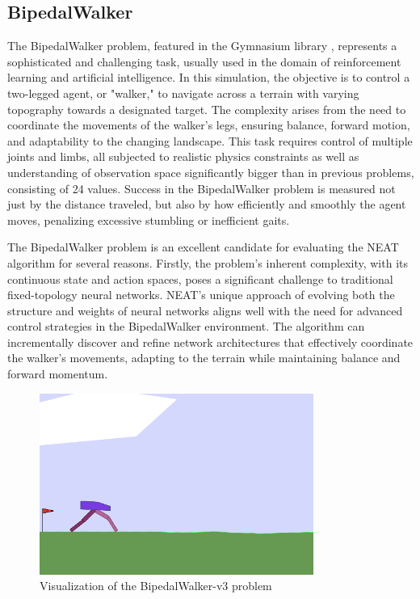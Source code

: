 \documentclass{article}
\begin{document}
        \subsection{BipedalWalker}
        The BipedalWalker problem, featured in the Gymnasium library \cite{gymnasium},
        represents a sophisticated and challenging task, usually used in the domain of reinforcement learning and artificial intelligence.
        In this simulation, the objective is to control a two-legged agent, or "walker," to navigate
        across a terrain with varying topography towards a designated target. The complexity arises from the
        need to coordinate the movements of the walker's legs, ensuring balance, forward motion, and adaptability to the changing landscape.
        This task requires control of multiple joints and limbs, all subjected to realistic physics constraints as well as understanding
        of observation space significantly bigger than in previous problems, consisting of 24 values.
        Success in the BipedalWalker problem is measured not just by the distance traveled,
        but also by how efficiently and smoothly the agent moves, penalizing excessive stumbling or inefficient gaits.

        \par The BipedalWalker problem is an excellent candidate for evaluating the NEAT
        algorithm for several reasons. Firstly, the problem's inherent complexity, with its continuous state and action spaces,
        poses a significant challenge to traditional fixed-topology neural networks.
        NEAT's unique approach of evolving both the structure and weights of neural networks aligns well with the need 
        for advanced control strategies in the BipedalWalker environment. The algorithm can 
        incrementally discover and refine network architectures that effectively coordinate the walker's
        movements, adapting to the terrain while maintaining balance and forward momentum.

    \begin{figure}[h]
        \centering
        \includegraphics[width=0.8\textwidth]{walker.png}
        \caption{Visualization of the BipedalWalker-v3 problem}
    \end{figure}
\end{document}
